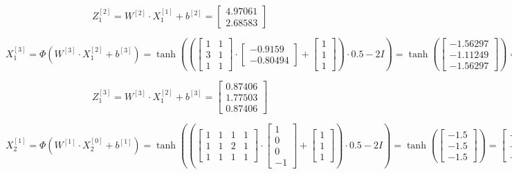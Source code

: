 \documentclass{article}
\begin{document}
\[ Z^{[2]}_1 = W^{[2]} \cdot X^{[1]}_1 + b^{[2]} = \begin{bmatrix} 4.97061 \\ 2.68583 \end{bmatrix} \]

\[ X^{[3]}_1 = \Phi(W^{[3]} \cdot X^{[2]}_1 + b^{[3]}) = \tanh \left( \left(\begin{bmatrix} 1 & 1  \\ 3 & 1 \\ 1 & 1 \end{bmatrix} \cdot \begin{bmatrix} -0.9159 \\ -0.80494 \end{bmatrix} + \begin{bmatrix} 1 \\ 1 \\ 1 \end{bmatrix} \right) \cdot 0.5 - 2I \right) = \tanh \left( \begin{bmatrix} -1.56297 \\ -1.11249 \\ -1.56297 \end{bmatrix} \right)  = \begin{bmatrix} -0.9159 \\ -0.80494 \\ -0.9159 \end{bmatrix} \]

\[ Z^{[3]}_1 = W^{[3]} \cdot X^{[2]}_1 + b^{[3]} = \begin{bmatrix} 0.87406 \\ 1.77503 \\ 0.87406 \end{bmatrix} \]

\[ X^{[1]}_2 = \Phi(W^{[1]} \cdot X^{[0]}_2 + b^{[1]}) = \tanh \left( \left(\begin{bmatrix} 1 & 1 & 1 & 1 \\ 1 & 1 & 2 & 1 \\ 1 & 1 & 1 & 1 \end{bmatrix} \cdot \begin{bmatrix} 1 \\ 0 \\ 0 \\ -1 \end{bmatrix} + \begin{bmatrix} 1 \\ 1 \\ 1 \end{bmatrix} \right) \cdot 0.5 - 2I \right) = \tanh \left( \begin{bmatrix} -1.5 \\ -1.5 \\ -1.5 \end{bmatrix} \right)  = \begin{bmatrix} -0.90515 \\ -0.90515 \\ -0.90515 \end{bmatrix} \]
\end{document}
